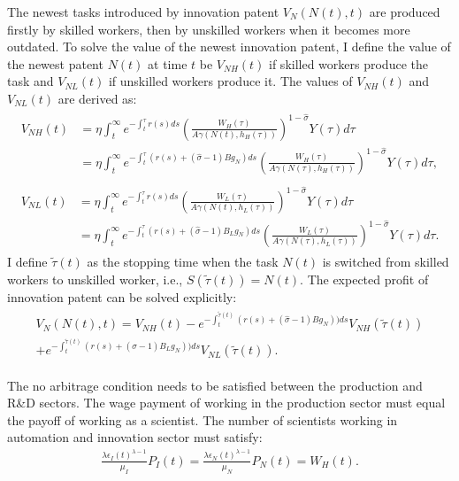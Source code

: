 \documentclass[12pt]{article}
\begin{document}
The newest tasks introduced by innovation patent $V_N(N(t),t)$ are produced firstly by skilled workers, then by unskilled workers when it becomes more outdated. To solve the value of the newest innovation patent, I define the value of the newest patent $N(t)$ at time $t$ be $V_{NH}(t)$ if skilled workers produce the task and $V_{NL}(t)$ if unskilled workers produce it. The values of $V_{NH}(t)$ and $V_{NL}(t)$ are derived as: 
\begin{align*}
\begin{split}
V_{NH}(t) &= \eta\int_t^{\infty} e^{-\int_{t}^{\tau}r(s)ds}(\frac{W_H(\tau)}{A\gamma(N(t),h_H(\tau))})^{1-\hat{\sigma}}Y(\tau)d\tau \\
								&= \eta\int_t^{\infty} e^{-\int_{t}^{\tau}(r(s)+(\hat{\sigma}-1)Bg_N)ds}(\frac{W_H(\tau)}{A\gamma(N(\tau),h_H(\tau))})^{1-\hat{\sigma}}Y(\tau)d\tau,
\end{split} \\
\begin{split}
V_{NL}(t) &=\eta \int_t^{\infty} e^{-\int_{t}^{\tau}r(s)ds}(\frac{W_L(\tau)}{A\gamma(N(t),h_L(\tau))})^{1-\hat{\sigma}}Y(\tau)d\tau \\
								&= \eta \int_t^{\infty} e^{-\int_{t}^{\tau}(r(s)+(\hat{\sigma}-1)B_Lg_N)ds}(\frac{W_L(\tau)}{A\gamma(N(\tau),h_L(\tau))})^{1-\hat{\sigma}}Y(\tau)d\tau.
\end{split}
\end{align*}
I define $\tilde{\tau}(t)$ as the stopping time when the task $N(t)$ is switched from skilled workers to unskilled worker, i.e., $S(\tilde{\tau}(t)) = N(t)$. The expected profit of innovation patent can be solved explicitly: 
\begin{align*}
\begin{split}
 V_N(N(t),t) = V_{NH}(t)-e^{-\int_{t}^{\tilde{\tau}(t)}(r(s)+(\hat{\sigma}-1)Bg_N))ds}V_{NH}(\tilde{\tau}(t)) \\
 +e^{-\int_{t}^{\tilde{\tau}(t)}(r(s)+(\hat{\sigma}-1)B_Lg_N))ds}V_{NL}(\tilde{\tau}(t)).
 \end{split}
\end{align*}

The no arbitrage condition needs to be satisfied between the production and R\&D sectors. The wage payment of working in the production sector must equal the payoff of working as a scientist. The number of scientists working in automation and innovation sector must satisfy:
\begin{align}
\label{epsilon_NI}
\frac{\lambda\epsilon_I(t)^{\lambda-1}}{\mu_I}P_I(t) = \frac{\lambda\epsilon_N(t)^{\lambda-1}}{\mu_N}P_N(t) = W_H(t).
\end{align}
\end{document}
